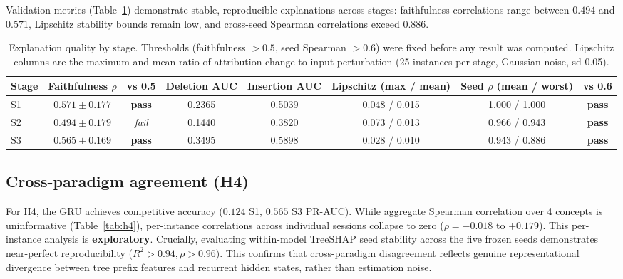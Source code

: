 \documentclass[a4paper]{article}
\newcommand{\pass}{\textbf{pass}}
\newcommand{\fail}{\textit{fail}}
\begin{document}
Validation metrics (Table~\ref{tab:quality}) demonstrate stable, reproducible
explanations across stages: faithfulness correlations range between $0.494$ and
$0.571$, Lipschitz stability bounds remain low, and cross-seed Spearman correlations
exceed $0.886$.

\begin{table}[t]
\centering
\caption{Explanation quality by stage. Thresholds (faithfulness $>0.5$,
seed Spearman $>0.6$) were fixed before any result was computed. Lipschitz
columns are the maximum and mean ratio of attribution change to input
perturbation (25 instances per stage, Gaussian noise, sd 0.05).}
\label{tab:quality}
\small
\begin{tabular}{@{}lccccccc@{}}
\toprule
\textbf{Stage} & \textbf{Faithfulness $\rho$} & \textbf{vs 0.5} &
\textbf{Deletion AUC} & \textbf{Insertion AUC} &
\textbf{Lipschitz (max / mean)} &
\textbf{Seed $\rho$ (mean / worst)} & \textbf{vs 0.6} \\
\midrule
S1 & $0.571 \pm 0.177$ & \pass & 0.2365 & 0.5039 & 0.048 / 0.015 & 1.000 / 1.000 & \pass \\
S2 & $0.494 \pm 0.179$ & \fail & 0.1440 & 0.3820 & 0.073 / 0.013 & 0.966 / 0.943 & \pass \\
S3 & $0.565 \pm 0.169$ & \pass & 0.3495 & 0.5898 & 0.028 / 0.010 & 0.943 / 0.886 & \pass \\
\bottomrule
\end{tabular}
\end{table}

\subsection{Cross-paradigm agreement (H4)}
\label{sec:results-h4}

For H4, the GRU achieves competitive accuracy ($0.124$ S1, $0.565$ S3 PR-AUC).
While aggregate Spearman correlation over 4 concepts is uninformative
(Table~\ref{tab:h4}), per-instance correlations across individual sessions collapse
to zero ($\rho = -0.018$ to $+0.179$). This per-instance analysis is \textbf{exploratory}.
Crucially, evaluating within-model TreeSHAP seed stability across the five frozen
seeds demonstrates near-perfect reproducibility ($R^2 > 0.94, \rho > 0.96$). This
confirms that cross-paradigm disagreement reflects genuine representational
divergence between tree prefix features and recurrent hidden states, rather than
estimation noise.
\end{document}
